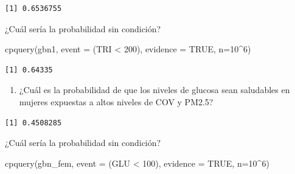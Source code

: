 \documentclass[
  11pt,
  a4paper,
]{article}
\newenvironment{Shaded}{\begin{snugshade}}{\end{snugshade}}
\newcommand{\AttributeTok}[1]{\textcolor[rgb]{0.40,0.45,0.13}{#1}}
\newcommand{\ConstantTok}[1]{\textcolor[rgb]{0.56,0.35,0.01}{#1}}
\newcommand{\DecValTok}[1]{\textcolor[rgb]{0.68,0.00,0.00}{#1}}
\newcommand{\FloatTok}[1]{\textcolor[rgb]{0.68,0.00,0.00}{#1}}
\newcommand{\FunctionTok}[1]{\textcolor[rgb]{0.28,0.35,0.67}{#1}}
\newcommand{\NormalTok}[1]{\textcolor[rgb]{0.00,0.23,0.31}{#1}}
\newcommand{\SpecialCharTok}[1]{\textcolor[rgb]{0.37,0.37,0.37}{#1}}
\providecommand{\tightlist}{%
  \setlength{\itemsep}{0pt}\setlength{\parskip}{0pt}}\usepackage{longtable,booktabs,array}
\begin{document}
\begin{verbatim}
[1] 0.6536755
\end{verbatim}

¿Cuál sería la probabilidad sin condición?

\begin{Shaded}
\begin{Highlighting}[numbers=left,,]
\FunctionTok{cpquery}\NormalTok{(gbn1, }\AttributeTok{event =}\NormalTok{ (TRI }\SpecialCharTok{\textless{}} \DecValTok{200}\NormalTok{), }\AttributeTok{evidence =} \ConstantTok{TRUE}\NormalTok{, }\AttributeTok{n=}\DecValTok{10}\SpecialCharTok{\^{}}\DecValTok{6}\NormalTok{)}
\end{Highlighting}
\end{Shaded}

\begin{verbatim}
[1] 0.64335
\end{verbatim}

\begin{enumerate}
\def\labelenumi{\arabic{enumi}.}
\setcounter{enumi}{1}
\tightlist
\item
  ¿Cuál es la probabilidad de que los niveles de glucosa sean saludables
  en mujeres expuestas a altos niveles de COV y PM2.5?
\end{enumerate}

\begin{Shaded}
\end{Shaded}

\begin{verbatim}
[1] 0.4508285
\end{verbatim}

¿Cuál sería la probabilidad sin condición?

\begin{Shaded}
\begin{Highlighting}[numbers=left,,]
\FunctionTok{cpquery}\NormalTok{(gbn\_fem, }\AttributeTok{event =}\NormalTok{ (GLU }\SpecialCharTok{\textless{}} \DecValTok{100}\NormalTok{), }\AttributeTok{evidence =} \ConstantTok{TRUE}\NormalTok{, }\AttributeTok{n=}\DecValTok{10}\SpecialCharTok{\^{}}\DecValTok{6}\NormalTok{)}
\end{Highlighting}
\end{Shaded}
\end{document}
